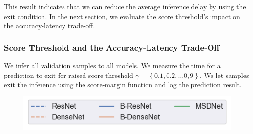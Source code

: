 This result indicates that we can reduce the average inference delay by using the exit condition. In the next section, we evaluate the score threshold's impact on the accuracy-latency trade-off.

\subsubsection{Score Threshold and the Accuracy-Latency Trade-Off}

We infer all validation samples to all models. We measure the time for a prediction to exit for raised score threshold $ \gamma = \left\{0.1, 0.2, \dots 0,9\right\} $. We let samples exit the inference using the score-margin function and log the prediction result. 

\begin{figure}
	\captionsetup[subfigure]{justification=centering,farskip=0pt,captionskip=0pt}
	\centering
	\includegraphics[width=.35\linewidth]{figures/threshold_plots/inference_legend}
	\\
	\hfill
	\hfill

\end{figure}
